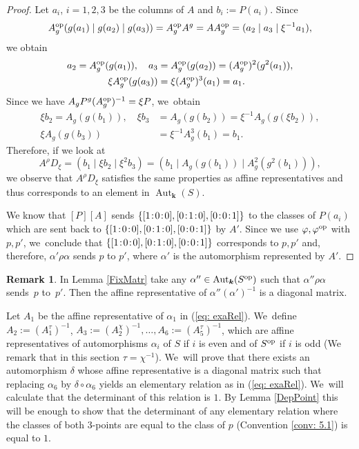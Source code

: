 \documentclass[JEP,XML,SOM,Unicode,NoFloatCountersInSection, NoEqCountersInSection,published]{cedram}
\newcommand{\op}{\textup{op}}
\newcommand{\sep}{\mkern2mu{:}\mkern2mu}
\theoremstyle{definition}
\newtheorem{remark}[theorem]{Remark}
\newcommand{\kk}{{\boldsymbol{k}}}
\DeclareMathOperator{\Aut}{Aut}
\begin{document}
\begin{proof}
Let $a_i$, $i=1,2,3$ be the columns of $A$ and $b_i := P(a_i)$. Since
\[
A_g^{\op}(g(a_1) \mid g(a_2) \mid g(a_3)) = A_g^{\op} A^g = A A_g^{\op} = (a_2 \mid a_3 \mid \xi^{-1} a_1),
\]
we obtain
\begin{align*}
a_2 = A_g^{\op}(g(a_1)),\quad
a_3 &= A_g^{\op} (g(a_2)) = (A_g^{\op})^2(g^2(a_1)),\\
\xi A_g^{\op}(g(a_3)) &= \xi (A_g^{\op})^3 (a_1) = a_1.
\end{align*}
Since we have $A_g P^g (A_g^{\op})^{-1} = \xi P$, we~obtain
\begin{align*}
\xi b_2 = A_g(g(b_1)),
\quad
\xi b_3 &= A_g(g(b_2)) = \xi^{-1} A_g(g(\xi b_2)),
\\
\xi A_g(g(b_3)) &= \xi^{-1} A_g^3(b_1) = b_1.
\end{align*}
Therefore, if we look at
\[
A^{\rho} D_{\xi} = (b_1 \mid \xi b_2 \mid \xi^2 b_3) = (b_1 \mid A_g(g(b_1)) \mid A_g^2(g^2(b_1))),
\]
we observe that $A^{\rho} D_{\xi}$ satisfies the same properties as affine representatives and thus corresponds to an element in $\Aut_{\kk}(S)$.

We know that $[P] [A]$ sends $\{ [1\sep 0\sep 0], [0\sep 1\sep 0],[0\sep 0\sep 1]\}$ to the classes of $P(a_i)$ which are sent back to $\{ [1\sep 0\sep 0], [0\sep 1\sep 0],[0\sep 0\sep 1]\}$ by $A'$. Since we use $\varphi, \varphi^{\op}$ with $p,p'$, we~conclude that $\{ [1\sep 0\sep 0], [0\sep 1\sep 0],[0\sep 0\sep 1]\}$ corresponds to $p,p'$ and, therefore, $\alpha' \rho \alpha$ sends $p$ to $p'$, where $\alpha'$ is the automorphism represented by $A'$.
\end{proof}
\begin{remark}
In Lemma \ref{FixMatr} take any $\alpha'' \in \Aut_{\kk}(S^{\op})$ such that $\alpha'' \rho \alpha$ sends~$p$ to~$p'$. Then the affine representative of $\alpha''(\alpha')^{-1}$ is a diagonal matrix.
\end{remark}
Let $A_1$ be the affine representative of $\alpha_1$ in (\ref{eq: exaRel}). We~define $A_2 := (A_1^{\tau})^{-1}$, $A_3 := (A_2^{\chi})^{-1}, \dots , A_6 := (A_5^{\tau})^{-1}$, which are affine representatives of automorphisms $\alpha_i$ of $S$ if $i$ is even and of $S^{\op}$ if $i$ is odd (We remark that in this section $\tau = \chi^{-1}$). We~will prove that there exists an automorphism $\delta$ whose affine representative is a diagonal matrix such that replacing $\alpha_6$ by $\delta \circ \alpha_6$ yields an elementary relation as in (\ref{eq: exaRel}). We~will calculate that the determinant of this relation is $1$. By Lemma \ref{DepPoint} this will be enough to show that the determinant of any elementary relation where the classes of both $3$\nobreakdash-points are equal to the class of $p$ (\cf Convention \ref{conv: 5.1}) is equal to $1$.\enlargethispage{-4\baselineskip}
\end{document}

